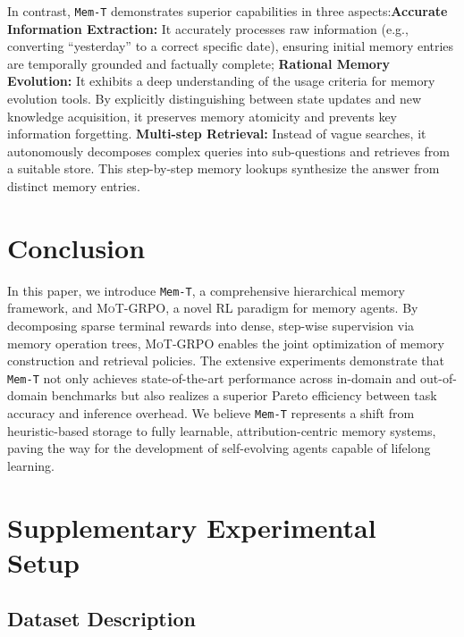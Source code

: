 \documentclass[11pt, a4paper]{lumia}
\newcommand{\ourmethod}{{\texttt{Mem-T}}\xspace} %
\newcommand{\ourtrain}{{\textsc{MoT-GRPO}}\xspace} %
\begin{document}
In contrast, \ourmethod demonstrates superior capabilities in three aspects:\textbf{Accurate Information Extraction:} It accurately processes raw information (e.g., converting ``yesterday'' to a correct specific date), ensuring initial memory entries are temporally grounded and factually complete; \textbf{ Rational Memory Evolution:} It exhibits a deep understanding of the usage criteria for memory evolution tools. By explicitly distinguishing between state updates and new knowledge acquisition, it preserves memory atomicity and prevents key information forgetting.
\textbf{ Multi-step Retrieval:} Instead of vague searches, it autonomously decomposes complex queries into sub-questions and retrieves from a suitable store. This step-by-step memory lookups synthesize the answer from distinct memory entries.

\section{Conclusion}
In this paper, we introduce \ourmethod, a comprehensive hierarchical memory framework, and \ourtrain, a novel RL paradigm for memory agents. By decomposing sparse terminal rewards into dense, step-wise supervision via memory operation trees, \ourtrain enables the joint optimization of memory construction and retrieval policies. The extensive experiments demonstrate that \ourmethod not only achieves state-of-the-art performance across in-domain and out-of-domain benchmarks but also realizes a superior Pareto efficiency between task accuracy and inference overhead. We believe \ourmethod represents a shift from heuristic-based storage to fully learnable, attribution-centric memory systems, paving the way for the development of self-evolving agents capable of lifelong learning.



% 


\appendix

\section{Supplementary Experimental Setup}
\subsection{Dataset Description}
\label{app:dataset}
\end{document}
